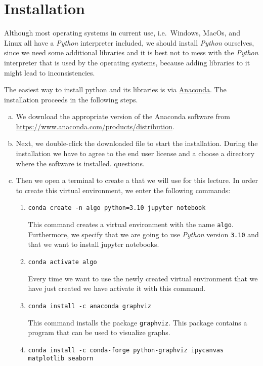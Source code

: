 \section{Installation}
Although most operating systems in current use, i.e.~Windows, MacOs, and Linux all have a \textsl{Python}
interpreter included, we should install \textsl{Python} ourselves, since we need some additional libraries and it is best
not to mess with the \textsl{Python} interpreter that is used by the operating systems, because adding
libraries to it might lead to inconsistencies.

The easiest way to install python and its libraries is via \href{https://www.anaconda.com/download/}{Anaconda}.
The installation proceeds in the following steps.
\begin{enumerate}[(a)]
\item We download the appropriate version of the Anaconda software from
      \\[0.2cm]
      \hspace*{1.3cm}
      \href{https://www.anaconda.com/products/distribution}{https://www.anaconda.com/products/distribution}.
\item Next, we double-click the downloaded file to start the installation.  During the installation we have to
      agree to the end user license and a choose a directory where the software is installed.
      questions.  
\item Then we open a terminal to create a  that we will use for this lecture.
      In order to create this virtual environment, we enter the following commands:
      \begin{enumerate}
      \item \texttt{conda create -n algo python=3.10 jupyter notebook}

            This command creates a virtual environment with the name \texttt{algo}.  Furthermore, we specify
            that we are going to use \textsl{Python} version \texttt{3.10} and that we want to install
            jupyter notebooks.
      \item \texttt{conda activate algo}

            Every time we want to use the newly created virtual environment that we have just created we have
            activate it with this command.
      \item \texttt{conda install -c anaconda graphviz}

            This command installs the package \texttt{graphviz}.  This package contains a program that
            can be used to visualize graphs.
      \item \texttt{conda install -c conda-forge python-graphviz ipycanvas matplotlib seaborn}


\end{enumerate}
\end{enumerate}
